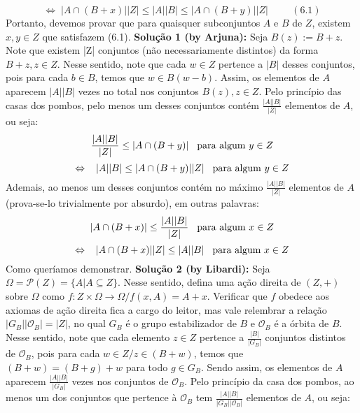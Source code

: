 $$\Leftrightarrow \; |A\cap (B+x)||Z|\le |A||B|\le |A\cap (B+y)||Z| \hspace{1cm} (6.1)$$
\newline
Portanto, devemos provar que para quaisquer subconjuntos $A$ e $B$ de $Z$, existem $x,y\in Z$ que satisfazem (6.1).
\newline \newline
\textbf{Solução 1 (by Arjuna):}
\newline
Seja $B(z) := B+z$. Note que existem |Z| conjuntos (não necessariamente distintos) da forma $B+z,z\in Z$. Nesse sentido, note que cada $w\in Z$ pertence a $|B|$ desses conjuntos, pois para cada $b\in B$, temos que $w\in B(w-b)$. Assim, os elementos de $A$ aparecem $|A||B|$ vezes no total nos conjuntos $B(z),z\in Z$. Pelo princípio das casas dos pombos, pelo menos um desses conjuntos contém $\frac{|A||B|}{|Z|}$ elementos de $A$, ou seja:
$$\frac{|A||B|}{|Z|}\le |A\cap (B+y)|\hspace{0.3cm} \text{para algum $y\in Z$}$$
$$\Leftrightarrow \hspace{0.3cm} |A||B|\le |A\cap (B+y)||Z|\hspace{0.3cm} \text{para algum $y\in Z$}$$
Ademais, ao menos um desses conjuntos contém no máximo $\frac{|A||B|}{|Z|}$ elementos de $A$ (prova-se-lo trivialmente por absurdo), em outras palavras:
$$|A\cap (B+x)|\le \frac{|A||B|}{|Z|}\hspace{0.3cm} \text{para algum $x\in Z$}$$
$$\Leftrightarrow \hspace{0.3cm}|A\cap (B+x)||Z|\le |A||B|\hspace{0.3cm} \text{para algum $x\in Z$}$$
Como queríamos demonstrar.
\newline \newline
\textbf{Solução 2 (by Libardi):}
\newline
Seja $\Omega =\mathcal{P}(Z) = \{A|A\subseteq Z\}$. Nesse sentido, defina uma ação direita de $(Z,+)$ sobre $\Omega$ como $f:Z\times \Omega \rightarrow \Omega /f(x, A) = A+x$. Verificar que $f$ obedece aos axiomas de ação direita fica a cargo do leitor, mas vale relembrar a relação $|G_B||\mathcal{O}_B| = |Z|$, no qual $G_B$ é o grupo estabilizador de $B$ e $\mathcal{O}_B$ é a órbita de $B$. Nesse sentido, note que cada elemento $z\in Z$ pertence a $\frac{|B|}{|G_B|}$ conjuntos distintos de $\mathcal{O}_B$, pois para cada $w\in Z/z\in(B+w)$, temos que $(B+w)=(B+g)+w$ para todo $g\in G_B$. Sendo assim, os elementos de $A$ aparecem $\frac{|A||B|}{|G_B|}$ vezes nos conjuntos de $\mathcal{O}_B$. Pelo princípio da casa dos pombos, ao menos um dos conjuntos que pertence à $\mathcal{O}_B$ tem $\frac{|A||B|}{|G_B||\mathcal{O}_B|}$ elementos de $A$, ou seja:
